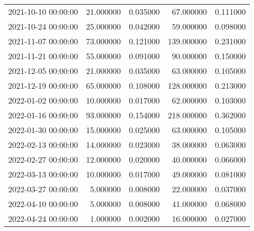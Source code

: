 \begin{tabular}{lrrrr}
2021-10-10 00:00:00 & 21.000000 & 0.035000 & 67.000000 & 0.111000 \\
2021-10-24 00:00:00 & 25.000000 & 0.042000 & 59.000000 & 0.098000 \\
2021-11-07 00:00:00 & 73.000000 & 0.121000 & 139.000000 & 0.231000 \\
2021-11-21 00:00:00 & 55.000000 & 0.091000 & 90.000000 & 0.150000 \\
2021-12-05 00:00:00 & 21.000000 & 0.035000 & 63.000000 & 0.105000 \\
2021-12-19 00:00:00 & 65.000000 & 0.108000 & 128.000000 & 0.213000 \\
2022-01-02 00:00:00 & 10.000000 & 0.017000 & 62.000000 & 0.103000 \\
2022-01-16 00:00:00 & 93.000000 & 0.154000 & 218.000000 & 0.362000 \\
2022-01-30 00:00:00 & 15.000000 & 0.025000 & 63.000000 & 0.105000 \\
2022-02-13 00:00:00 & 14.000000 & 0.023000 & 38.000000 & 0.063000 \\
2022-02-27 00:00:00 & 12.000000 & 0.020000 & 40.000000 & 0.066000 \\
2022-03-13 00:00:00 & 10.000000 & 0.017000 & 49.000000 & 0.081000 \\
2022-03-27 00:00:00 & 5.000000 & 0.008000 & 22.000000 & 0.037000 \\
2022-04-10 00:00:00 & 5.000000 & 0.008000 & 41.000000 & 0.068000 \\
2022-04-24 00:00:00 & 1.000000 & 0.002000 & 16.000000 & 0.027000 \\
\bottomrule
\end{tabular}
